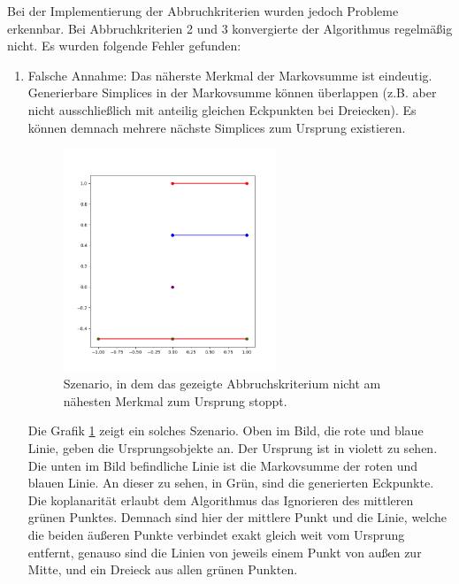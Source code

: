Bei der Implementierung der Abbruchkriterien wurden jedoch Probleme erkennbar. Bei Abbruchkriterien 2 und 3 konvergierte der Algorithmus regelmäßig nicht. Es wurden folgende Fehler gefunden:
\begin{enumerate}
	\item Falsche Annahme: Das näherste Merkmal der Markovsumme ist eindeutig.\\
	Generierbare Simplices in der Markovsumme können überlappen (z.B. aber nicht ausschließlich mit anteilig gleichen Eckpunkten bei Dreiecken). Es können demnach mehrere nächste Simplices zum Ursprung existieren.\\

\begin{figure}
	\centering
	\includegraphics[width=0.6\textwidth]{./res/parallel_features.png}
	\caption{Szenario, in dem das gezeigte Abbruchskriterium nicht am nähesten Merkmal zum Ursprung stoppt.}
	\label{fig:parfeat}
\end{figure}

		Die Grafik \ref{fig:parfeat} zeigt ein solches Szenario. Oben im Bild, die rote und blaue Linie, geben die Ursprungsobjekte an. Der Ursprung ist in violett zu sehen. Die unten im Bild befindliche Linie ist die Markovsumme der roten und blauen Linie. An dieser zu sehen, in Grün, sind die generierten Eckpunkte. Die koplanarität erlaubt dem Algorithmus das Ignorieren des mittleren grünen Punktes. Demnach sind hier der mittlere Punkt und die Linie, welche die beiden äußeren Punkte verbindet exakt gleich weit vom Ursprung entfernt, genauso sind die Linien von jeweils einem Punkt von außen zur Mitte, und ein Dreieck aus allen grünen Punkten.


\end{enumerate}
